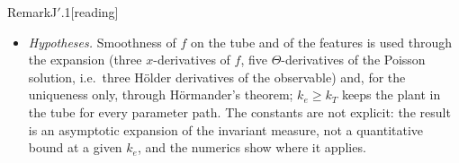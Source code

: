 \begin{rmk}{Remark}{J$'$.1}[reading]
\begin{itemize}
    even to first order: the periodic forcing alone (the term $\pi\langle u\wedge\dot u\rangle$, the signed area swept
    by the fast parameter loop) breaks the time-reversal symmetry, and the slow dynamics carries in addition the
    current $j_1$ of Proposition J$'$.2, nonzero exactly when the first-order drift is not reciprocal. The first is a
    property of any periodically forced system; the second is the signature of closed-loop learning (Theorem I).
  \item \emph{Hypotheses.} Smoothness of $f$ on the tube and of the features is used through the expansion (three
    $x$-derivatives of $f$, five $\Theta$-derivatives of the Poisson solution, i.e.\ three H\"older derivatives of the
    observable) and, for the uniqueness only, through H\"ormander's theorem; $k_e\ge k_T$ keeps the plant in the tube
    for every parameter path. The constants are not explicit: the result is an asymptotic expansion of the invariant
    measure, not a quantitative bound at a given $k_e$, and the numerics show where it applies.
\end{itemize}
\end{rmk}

